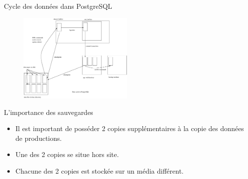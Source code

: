 \begin{frame}{Cycle des données dans PostgreSQL}

\begin{figure}
\begin{center}
\includegraphics[angle=0, width=0.5\textwidth]{images/internals.eps}
\end{center}
\end{figure}

\begin{toile}
\end{toile}

\end{frame}


\begin{frame}{L'importance des sauvegardes}

\begin{itemize}

\item Il est important de posséder 2 copies supplémentaires à la copie des données de productions.
\item Une des 2 copies se situe hors site.
\item Chacune des 2 copies est stockée sur un média différent.

\end{itemize}

\begin{toile}
\end{toile}

\end{frame}



